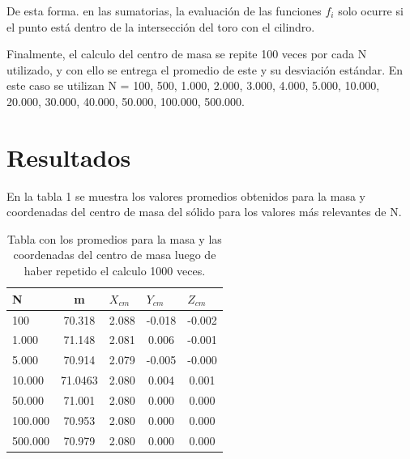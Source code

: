 \documentclass[letterpaper,oneside]{article}
\begin{document}
De esta forma. en las sumatorias, la evaluación de  las funciones $f_i$ solo ocurre si el punto está dentro de la intersección del toro con el cilindro. 

Finalmente, el calculo del centro de masa se repite 100 veces por cada N utilizado, y con ello se entrega el promedio de este y su desviación estándar. En este caso se utilizan N = 100, 500, 1.000, 2.000, 3.000, 4.000, 5.000, 10.000, 20.000, 30.000, 40.000,  50.000, 100.000, 500.000. 



\section{Resultados}
En la tabla 1 se muestra los valores promedios obtenidos para la masa y coordenadas del centro de masa del sólido para los valores más relevantes de N. 
\begin{table}
\begin{tabular}{|l|c|c|c|c|}
\hline
\textbf{N} & \textbf{m} & \multicolumn{1}{l|}{\textbf{$X_{cm}$}} & \multicolumn{1}{l|}{\textbf{$Y_{cm}$}} & \multicolumn{1}{l|}{\textbf{$Z_{cm}$}} \\ \hline
100        & 70.318     & 2.088                                  & -0.018                                 & -0.002                                 \\ \hline
1.000      & 71.148     & 2.081                                  & 0.006                                  & -0.001                                 \\ \hline
5.000      & 70.914     & 2.079                                  & -0.005                                 & -0.000                                 \\ \hline
10.000     & 71.0463    & 2.080                                  & 0.004                                  & 0.001                                  \\ \hline
50.000     & 71.001     & 2.080                                  & 0.000                                  & 0.000                                  \\ \hline
100.000    & 70.953     & 2.080                                  & 0.000                                  & 0.000                                  \\ \hline
500.000    & 70.979     & 2.080                                  & 0.000                                  & 0.000                                  \\ \hline

\end{tabular}
\caption{Tabla con los promedios para la masa y las coordenadas del centro de masa luego de haber repetido el calculo 1000 veces.}
\end{table}
\end{document}
